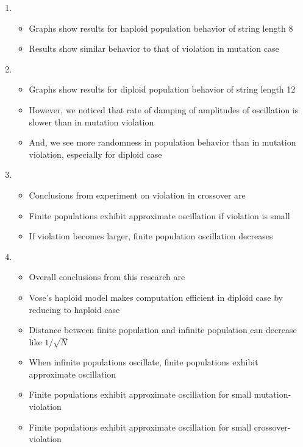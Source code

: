 \documentclass{article}
\begin{document}
\begin{enumerate}
\item
  \begin{itemize}
  \item Graphs show results for haploid population behavior of string length 8
  \item Results show similar behavior to that of violation in mutation case
  \end{itemize}
  
\item 
  \begin{itemize}
  \item Graphs show results for diploid population behavior of string length 12
  \item However, we noticed that rate of damping of amplitudes of oscillation is slower than in mutation violation  
  \item And, we see more randomness in population behavior than in mutation violation, especially for diploid case
  \end{itemize}
  
\item
  \begin{itemize}
  \item Conclusions from experiment on violation in crossover are 
  \item Finite populations exhibit approximate oscillation if violation is small
  \item If violation becomes larger, finite population oscillation decreases
  \end{itemize}
  
\item
  \begin{itemize}
  \item Overall conclusions from this research are
  \item Vose's haploid model makes computation efficient in diploid case by reducing to haploid case 
  \item Distance between finite population and infinite population can decrease like $1/\sqrt{N}$
  \item When infinite populations oscillate, finite populations exhibit approximate oscillation
  \item Finite populations exhibit approximate oscillation for small mutation-violation
  \item Finite populations exhibit approximate oscillation for small crossover-violation      
  
  \end{itemize}
  

\end{enumerate}
\end{document}
